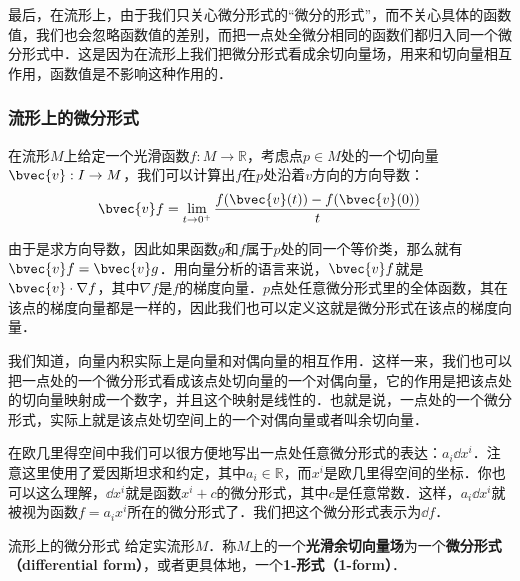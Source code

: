 最后，在流形上，由于我们只关心微分形式的“微分的形式”，而不关心具体的函数值，我们也会忽略函数值的差别，而把一点处全微分相同的函数们都归入同一个微分形式中．这是因为在流形上我们把微分形式看成余切向量场，用来和切向量相互作用，函数值是不影响这种作用的．

\subsubsection{流形上的微分形式}

在流形$M$上给定一个光滑函数$f:M\rightarrow \mathbb{R}$，考虑点$p\in M$处的一个切向量$\bvec{v}:I\rightarrow M$，我们可以计算出$f$在$p$处沿着$v$方向的方向导数：
\begin{equation}
\bvec{v}f=\lim\limits_{t\rightarrow 0^+}\frac{f(\bvec{v}(t))-f(\bvec{v}(0))}{t}
\end{equation}

由于是求方向导数，因此如果函数$g$和$f$属于$p$处的同一个等价类，那么就有$\bvec{v}f=\bvec{v}g$．用向量分析的语言来说，$\bvec{v}f$就是$\bvec{v}\cdot\nabla f$，其中$\nabla f$是$f$的梯度向量．$p$点处任意微分形式里的全体函数，其在该点的梯度向量都是一样的，因此我们也可以定义这就是微分形式在该点的梯度向量．

我们知道，向量内积实际上是向量和对偶向量的相互作用．这样一来，我们也可以把一点处的一个微分形式看成该点处切向量的一个对偶向量，它的作用是把该点处的切向量映射成一个数字，并且这个映射是线性的．也就是说，一点处的一个微分形式，实际上就是该点处切空间上的一个对偶向量或者叫余切向量．

在欧几里得空间中我们可以很方便地写出一点处任意微分形式的表达：$a_i\dd x^i$．注意这里使用了爱因斯坦求和约定，其中$a_i\in\mathbb{R}$，而$x^i$是欧几里得空间的坐标．你也可以这么理解，$\dd x^i$就是函数$x^i+c$的微分形式，其中$c$是任意常数．这样，$a_i\dd x^i$就被视为函数$f=a_ix^i$所在的微分形式了．我们把这个微分形式表示为$\dd f$．

\begin{definition}{流形上的微分形式}
给定实流形$M$．称$M$上的一个\textbf{光滑余切向量场}为一个\textbf{微分形式（differential form）}，或者更具体地，一个\textbf{1-形式（1-form）}．
\end{definition}






